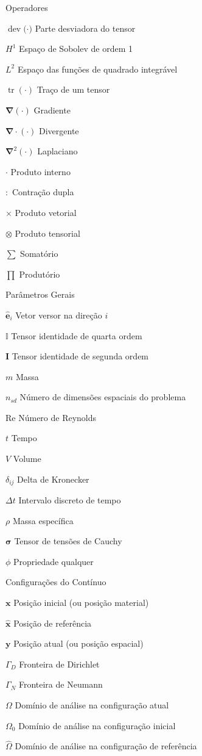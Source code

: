 \documentclass[12pt,
	openright,	%
	twoside,    %
	a4paper,			%
	sumario=tradicional,
	english,			%
	french, 			%
	brazil				%
]{USPSC}
\newcommand{\tr}{\mathop{\mathrm{tr}}\nolimits}
\newcommand{\dev}[1]{\mathop{\mathrm{dev}}\nolimits{#1}}
\newcommand{\Rey}{\mathrm{Re}}
\begin{document}
\begin{simbolos}
    \item[Operadores]
    \item[$\dev(\cdot)$] Parte desviadora do tensor
    \item[$H^1$] Espaço de Sobolev de ordem 1
    \item[$L^2$] Espaço das funções de quadrado integrável
    \item[$\tr(\cdot)$] Traço de um tensor
    \item[$\mathbf{\nabla}(\cdot)$] Gradiente
    \item[$\mathbf{\nabla}\cdot(\cdot)$] Divergente
    \item[$\mathbf{\nabla}^2(\cdot)$] Laplaciano
    \item[$\cdot$] Produto interno
    \item[$:$] Contração dupla
    \item[$\times$] Produto vetorial
    \item[$\otimes$] Produto tensorial
    \item[$\sum$] Somatório
    \item[$\prod$] Produtório

    \item[Parâmetros Gerais]
    \item[$\hat{\mathbf{e}}_i$] Vetor versor na direção $i$
    \item[$\mathbb{I}$] Tensor identidade de quarta ordem
    \item[$\mathbf{I}$] Tensor identidade de segunda ordem
    \item[$m$] Massa
    \item[$n_{sd}$] Número de dimensões espaciais do problema
    \item[$\Rey$] Número de Reynolds
    \item[$t$] Tempo
    \item[$V$] Volume
    \item[$\delta_{ij}$] Delta de Kronecker
    \item[$\Delta t$] Intervalo discreto de tempo
    \item[$\rho$] Massa específica
    \item[$\mathbf{\sigma}$] Tensor de tensões de Cauchy
    \item[$\phi$] Propriedade qualquer

    \item[Configurações do Contínuo]
    \item[$\mathbf{x}$] Posição inicial (ou posição material)
    \item[$\mathbf{\hat{x}}$] Posição de referência
    \item[$\mathbf{y}$] Posição atual (ou posição espacial)
    \item[$\Gamma_D$] Fronteira de Dirichlet
    \item[$\Gamma_N$] Fronteira de Neumann
    \item[$\Omega$] Domínio de análise na configuração atual
    \item[$\Omega_0$] Domínio de análise na configuração inicial
    \item[$\hat{\Omega}$] Domínio de análise na configuração de referência


\end{simbolos}
\end{document}
